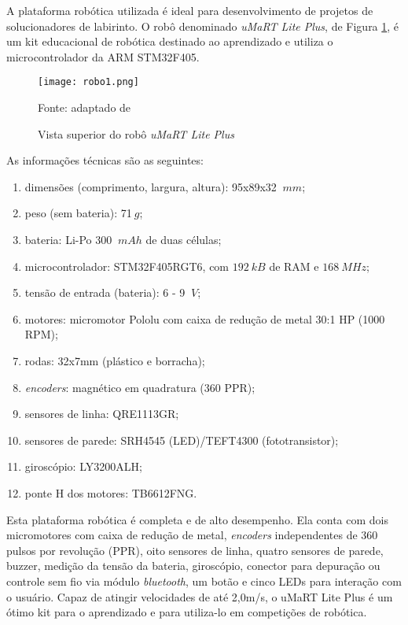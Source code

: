 A plataforma robótica utilizada é ideal para desenvolvimento de projetos de solucionadores de labirinto. O robô denominado \emph{uMaRT Lite Plus}, de Figura \ref{fig:robo1}, é um kit educacional de robótica destinado ao aprendizado e utiliza o microcontrolador da ARM STM32F405.

\begin{figure}[!htb]
	\caption{\label{fig:robo1}Vista superior do robô \emph{uMaRT Lite Plus}}
	\begin{center}
		\texttt{[image: robo1.png]}
	\end{center}
	\centering
	\small Fonte: adaptado de 
\end{figure}


As informações técnicas são as seguintes:

\begin{enumerate}[leftmargin=2cm,label=\alph*)]
	\item dimensões (comprimento, largura, altura): 95x89x32 $~mm$;
	\item peso (sem bateria): 71$~g$;
	\item bateria: Li-Po 300 $~mAh$ de duas células;
	\item microcontrolador: STM32F405RGT6, com $192~kB$ de RAM e $168~MHz$;
	\item tensão de entrada (bateria): 6 - 9 $~V$;
	\item motores: micromotor Pololu com caixa de redução de metal 30:1 HP (1000 RPM);
	\item rodas: 32x7mm (plástico e borracha);
	\item \textit{encoders}: magnético em quadratura (360 PPR);
	\item sensores de linha: QRE1113GR;
	\item sensores de parede: SRH4545 (LED)/TEFT4300 (fototransistor);
	\item giroscópio: LY3200ALH;
	\item ponte H dos motores: TB6612FNG.
\end{enumerate}

Esta plataforma robótica é completa e de alto desempenho. Ela conta com dois micromotores com caixa de redução de metal, \textit{encoders} independentes de 360 pulsos por revolução (PPR), oito sensores de linha, quatro sensores de parede, buzzer, medição da tensão da bateria, giroscópio, conector para depuração ou controle sem fio via módulo \textit{bluetooth}, um botão e cinco LEDs para interação com o usuário. Capaz de atingir velocidades de até 2,0m/s, o uMaRT Lite Plus é um ótimo kit para o aprendizado e para utiliza-lo em competições de robótica.

